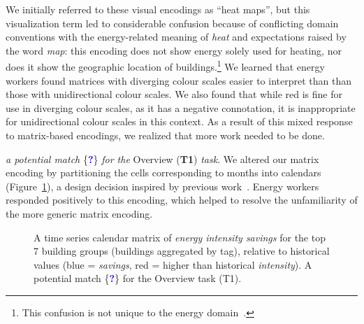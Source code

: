 \documentclass[journal]{vgtc}                %
\newcommand*\posmatch{\textcolor{blue}{{\bf ?}}}
\newcommand{\bstart}[1]{\vspace{1mm} \noindent{\textbf{#1:}}}
\begin{document}
We initially referred to these visual encodings as ``heat maps'', but this visualization term led to considerable confusion because of conflicting domain conventions with the energy-related meaning of {\it heat} and expectations raised by the word {\it map}: this encoding does not show energy solely used for heating, nor does it show the geographic location of buildings.\footnote{This confusion is not unique to the energy domain~\cite{Field2015,Heat2014,Wilkinson2009}.}
We learned that energy workers found matrices with diverging colour scales easier to interpret than than those with unidirectional colour scales. We also found that while red is fine for use in diverging colour scales, as it has a negative connotation, it is inappropriate for unidirectional colour scales in this context. 
As a result of this mixed response to matrix-based encodings, we realized that more work needed to be done.

\bstart{Calendar matrix} {\it a potential match} \{\posmatch\} {\it for the} Overview ({\bf T1}) {\it task}.
We altered our matrix encoding by partitioning the cells corresponding to months into calendars (Figure~\ref{fig:sandbox-calendar}), a design decision inspired by previous work~\cite{vanWijk1999}. 
Energy workers responded positively to this encoding, which helped to resolve the unfamiliarity of the more generic matrix encoding.

\begin{figure}[ht]
    \vspace{-0.3cm}
	\centering
	\vspace{-0.15cm}
	\caption{A time series calendar matrix of \textsl{energy intensity savings} for the top 7 building groups (buildings aggregated by tag), relative to historical values (blue = \textsl{savings}, red = higher than historical \textsl{intensity}). A potential match \{\posmatch\} for the Overview task (T1).}
	\label{fig:sandbox-calendar}
	\vspace{-0.45cm}
\end{figure}
\end{document}
